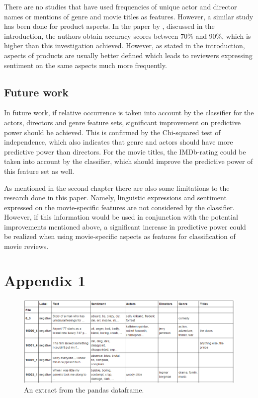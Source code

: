 \documentclass[
10pt, %
a4paper, %
oneside, %
headinclude,footinclude, %
] {book}%
\begin{document}
There are no studies that have used frequencies of unique actor and director names or mentions of genre and movie titles as features. However, a similar study has been done for product aspects. In the paper by \citet{yu2011aspect}, discussed in the introduction, the authors obtain accuracy scores between 70\% and 90\%, which is higher than this investigation achieved. However, as stated in the introduction, aspects of products are usually better defined which leads to reviewers expressing sentiment on the same aspects much more frequently. 

\section{Future work}

In future work, if relative occurrence is taken into account by the classifier for the actors, directors and genre feature sets, significant improvement on predictive power should be achieved. This is confirmed by the Chi-squared test of independence, which also indicates that genre and actors should have more predictive power than directors. For the movie titles, the IMDb-rating could be taken into account by the classifier, which should improve the predictive power of this feature set as well. 

As mentioned in the second chapter there are also some limitations to the research done in this paper. Namely, linguistic expressions and sentiment expressed on the movie-specific features are not considered by the classifier. However, if this information would be used in conjunction with the potential improvements mentioned above, a significant increase in predictive power could be realized when using movie-specific aspects as features for classification of movie reviews.


\cleardoublepage
{}
 


\chapter*{Appendix 1}

\begin{figure}[hbtp]\centering
\includegraphics[width=5in]{dataframe} 
\caption{An extract from the pandas dataframe.\label{Figure 3}}
\end{figure}
\end{document}

